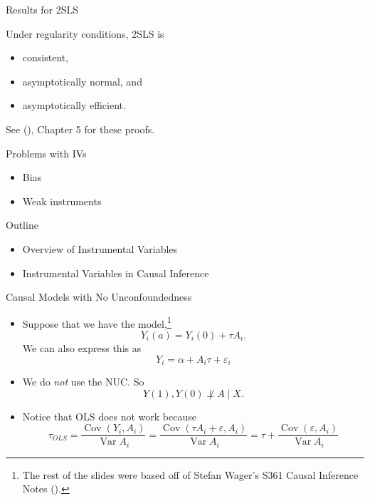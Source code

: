 \documentclass[handout]{beamer} %
\DeclareMathOperator*{\Cov}{Cov}
\DeclareMathOperator*{\Var}{Var}
\begin{document}
\begin{frame}{Results for 2SLS}

Under regularity conditions, 2SLS is
\begin{itemize}
  \item consistent,
  \item asymptotically normal, and 
  \item asymptotically efficient.
\end{itemize}

  See (\cite{wooldridge2010econometric}), Chapter 5 for these proofs.

\end{frame}

\begin{frame}{Problems with IVs}

  \begin{itemize}
    \item<2-> Bias
    \item<3-> Weak instruments
  \end{itemize}
  
\end{frame}

\begin{frame}{Outline}

{

\begin{itemize}
    \item<0> Overview of Instrumental Variables
    \item<1> Instrumental Variables in Causal Inference
\end{itemize}
}

\end{frame}

\begin{frame}{Causal Models with No Unconfoundedness}

  \begin{itemize}
    \item Suppose that we have the model,\footnote{The rest of the slides were
      based off of Stefan Wager's S361 Causal Inference Notes
      (\cite{wager2020stats}).}
      \[Y_i(a) = Y_i(0) + \tau A_i.\]
      We can also express this as 
      \[Y_i = \alpha + A_i \tau + \varepsilon_i\]
    \item We do \textit{not} use the NUC. So 
      \[Y(1), Y(0) \not\perp A \mid X.\]
    \item Notice that OLS does not work because
      \[\tau_{OLS} = \frac{\Cov(Y_i, A_i)}{\Var{A_i}} = 
      \frac{\Cov(\tau A_i + \varepsilon, A_i)}{\Var{A_i}} =
      \tau + 
      \frac{\Cov(\varepsilon, A_i)}{\Var{A_i}}\]
  \end{itemize}
  
\end{frame}
\end{document}
